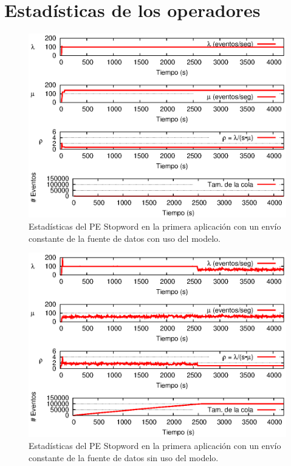 \chapter{Estad\'isticas de los operadores}
\label{apendice:estadisticas-operadores}
\begin{figure}[!ht]
\centering
    \includegraphics[scale=1]{images/exp/app1/uniform/cm/statusStopwordPE.eps}
    \caption{Estad\'isticas del PE Stopword en la primera aplicaci\'on con un env\'io constante de la fuente de datos con uso del modelo.}
    \label{fig:app1-uniform-statusStopwordPE-cm}
\end{figure}

\begin{figure}[!ht]
\centering
    \includegraphics[scale=1]{images/exp/app1/uniform/sm/statusStopwordPE.eps}
    \caption{Estad\'isticas del PE Stopword en la primera aplicaci\'on con un env\'io constante de la fuente de datos sin uso del modelo.}
    \label{fig:app1-uniform-statusStopwordPE-sm}
\end{figure}

